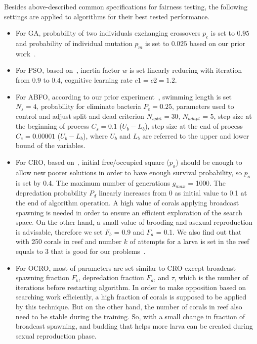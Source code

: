\documentclass[11pt,twoside]{article}
\begin{document}
\begin{multicols}{2}
Besides above-described common specifications for fairness testing, the following settings are applied to algorithms for their best tested performance.

\begin{itemize}
\item For GA, probability of two individuals exchanging crossovers $p_c$ is set to $0.95$ and probability of individual mutation $p_m$ is set to $0.025$ based on our prior work~\citep{ref_thieu}. 
\item For PSO, based on~\citep{ref_shi2001particle}, inertia factor $w$ is set linearly reducing with iteration from $0.9$ to $0.4$, cognitive learning rate $c1 = c2 = 1.2$.
\item For ABFO, according to our prior experiment~\cite{nguyen2019building}, swimming length is set $N_s=4$, probability for eliminate bacteria $P_e=0.25$, parameters used to control and adjust split and dead criterion $N_{split}=30$, $N_{adapt}$ = 5, step size at the beginning of process $C_s= 0.1$ ($U_b - L_b$), step size at the end of process $C_e=0.00001$ ($U_b - L_b$), where $U_b$ and $L_b$ are referred to the upper and lower bound of the variables.
\item For CRO, based on~\citep{ref_salcedo_sanz1}, initial free/occupied square ($p_{o}$) should be enough to allow new poorer solutions in order to have enough survival probability, so $p_{o}$ is set by 0.4. The maximum number of generations $g_{max}$ = 1000. The depredation probability $P_{d}$ linearly increases from 0 as initial value to 0.1 at the end of algorithm operation. A high value of corals applying broadcast spawning is needed in order to ensure an efficient exploration of the search space. On the other hand, a small value of brooding and asexual reproduction is advisable, therefore we set $F_{b}$ = 0.9 and \newline $F_{a}$ = 0.1. We also find out that with 250 corals in reef and number $k$ of attempts for a larva is set in the reef equals to 3 that is good for our problems~\citep{ref_salcedo_sanz1}.
\item For OCRO, most of parameters are set similar to CRO except broadcast spawning fraction $F_{b}$, depredation fraction $F_{d}$, and $\tau$, which is the number of iterations before restarting algorithm. In order to make opposition based on searching work efficiently, a high fraction of corals is supposed to be applied by this technique. But on the other hand, the number of corals in reef also need to be stable during the training. So, with a small change in fraction of broadcast spawning, and budding that helps more larva can be created during sexual reproduction phase.

\end{itemize}
\end{multicols}
\end{document}
